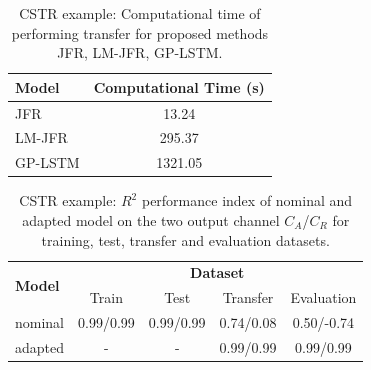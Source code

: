 \documentclass{article}
\begin{document}
\begin{table}[tb]
\caption{CSTR example: Computational time  of performing transfer for proposed methods JFR, LM-JFR, GP-LSTM. }
\centering
\begin{tabular}{l | c }
\textbf{Model} & \textbf{Computational Time  (s)} \\
\hline
JFR          & 13.24  \\
LM-JFR       & 295.37  \\
GP-LSTM      & 1321.05 \\
\hline
\end{tabular}
\label{tab:CSTR_comp_time}
\end{table} 

\begin{table}[tb]
\caption{CSTR example: $R^2$ performance index of  nominal and  adapted model on the two output channel $C_A$/$C_R$ for training, test, transfer and evaluation  datasets. }
\centering
\begin{tabular}{l | c  c  c  c}
\multirow{2}{*}{\textbf{Model}} & \multicolumn{4}{c}{\textbf{Dataset}} \\
                & Train      & Test       & Transfer & Evaluation       \\ %
\hline
nominal         & 0.99/0.99       & 0.99/0.99        & 0.74/0.08      & 0.50/-0.74  \\
adapted         & -          & -          & 0.99/0.99     & 0.99/0.99  \\
\hline
\end{tabular}
\label{tab:CSTR_performance}
\end{table}
\end{document}
